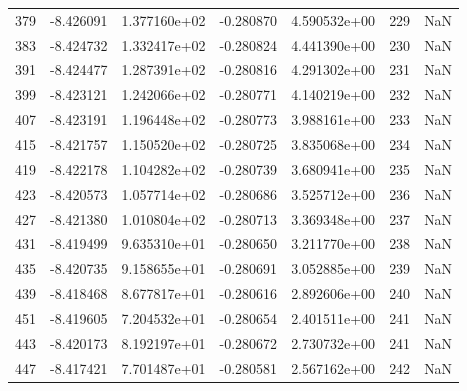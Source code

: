 \begin{tabular}{rrrrrrr}
 379 &  -8.426091 &  1.377160e+02 & -0.280870 &  4.590532e+00 &         229 & NaN \\
 383 &  -8.424732 &  1.332417e+02 & -0.280824 &  4.441390e+00 &         230 & NaN \\
 391 &  -8.424477 &  1.287391e+02 & -0.280816 &  4.291302e+00 &         231 & NaN \\
 399 &  -8.423121 &  1.242066e+02 & -0.280771 &  4.140219e+00 &         232 & NaN \\
 407 &  -8.423191 &  1.196448e+02 & -0.280773 &  3.988161e+00 &         233 & NaN \\
 415 &  -8.421757 &  1.150520e+02 & -0.280725 &  3.835068e+00 &         234 & NaN \\
 419 &  -8.422178 &  1.104282e+02 & -0.280739 &  3.680941e+00 &         235 & NaN \\
 423 &  -8.420573 &  1.057714e+02 & -0.280686 &  3.525712e+00 &         236 & NaN \\
 427 &  -8.421380 &  1.010804e+02 & -0.280713 &  3.369348e+00 &         237 & NaN \\
 431 &  -8.419499 &  9.635310e+01 & -0.280650 &  3.211770e+00 &         238 & NaN \\
 435 &  -8.420735 &  9.158655e+01 & -0.280691 &  3.052885e+00 &         239 & NaN \\
 439 &  -8.418468 &  8.677817e+01 & -0.280616 &  2.892606e+00 &         240 & NaN \\
 451 &  -8.419605 &  7.204532e+01 & -0.280654 &  2.401511e+00 &         241 & NaN \\
 443 &  -8.420173 &  8.192197e+01 & -0.280672 &  2.730732e+00 &         241 & NaN \\
 447 &  -8.417421 &  7.701487e+01 & -0.280581 &  2.567162e+00 &         242 & NaN \\
\bottomrule
\end{tabular}
